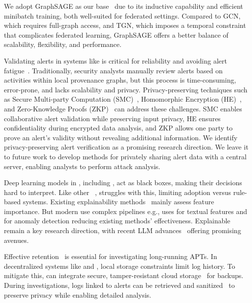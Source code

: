  We adopt GraphSAGE as our base \gnnshort\ due to its inductive capability and efficient minibatch training, both well-suited for federated settings. Compared to GCN, which requires full-graph access, and TGN, which imposes a temporal constraint that complicates federated learning, GraphSAGE offers a better balance of scalability, flexibility, and performance.


 Validating alerts in systems like \Sys is critical for reliability and avoiding alert fatigue~\cite{nodoze2019}. Traditionally, security analysts manually review alerts based on activities within local provenance graphs, but this process is time-consuming, error-prone, and lacks scalability and privacy. Privacy-preserving techniques such as Secure Multi-party Computation (SMC)~\cite{goldreich1998secure}, Homomorphic Encryption (HE)~\cite{yi2014homomorphic}, and Zero-Knowledge Proofs (ZKP)~\cite{fiege1987zero} can address these challenges. SMC enables collaborative alert validation while preserving input privacy, HE ensures confidentiality during encrypted data analysis, and ZKP allows one party to prove an alert's validity without revealing additional information. We identify privacy-preserving alert verification as a promising research direction. We leave it to future work to develop methods for privately sharing alert data with a central server, enabling analysts to perform attack analysis.

 Deep learning models in \pids, including \Sys, act as black boxes, making their decisions hard to interpret. Like other \pids~\cite{flash2024,cheng2023kairos,yangprographer}, \Sys struggles with this, limiting adoption versus rule-based systems. Existing explainability methods~\cite{antwarg2021explaining,brown2018recurrent,ardito2021revisiting,hwang2021sfd} mainly assess feature importance. But modern \pids use complex pipelines e.g., \flash uses \wordvec for textual features and \gnnshort for anomaly detection reducing existing methods' effectiveness. Explainable \pids remain a key research direction, with recent LLM advances~\cite{chang2024survey} offering promising avenues.

 Effective retention~\cite{wilbert2012log,rapsheet2020} is essential for investigating long-running APTs. In decentralized systems like \Sys and \disdet, local storage constraints limit log history. To mitigate this, \Sys can integrate secure, tamper-resistant cloud storage~\cite{kumar2018secure,hardlog} for backups. During investigations, logs linked to alerts can be retrieved and sanitized~\cite{portillo2019towards} to preserve privacy while enabling detailed analysis.



